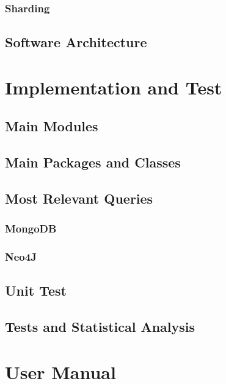 \documentclass[a4paper]{report}
\begin{document}
\subsection{Sharding}
\section{Software Architecture}


\chapter{Implementation and Test}
\section{Main Modules}
\section{Main Packages and Classes}
\section{Most Relevant Queries}
\subsection{MongoDB}
\subsection{Neo4J}
\section{Unit Test}
\section{Tests and Statistical Analysis}

\chapter{User Manual}
\end{document}
